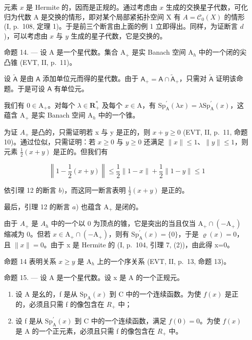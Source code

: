元素 \(x\) 是 Hermite 的，因而是正规的。通过考虑由 \(x\) 生成的交换星子代数，可化归为代数 A 是交换的情形，即对某个局部紧拓扑空间 X 有 \(A = \mathcal{C}_0(X)\) 的情形 (I, p.~108, 定理 1)。于是前三个断言由上面的例 1 立即得出。同样，为证断言 \(d\))，可以考虑由 \(x\) 与 \(y\) 生成的星子代数，它是交换的。

命题 14. --- 设 A 是一个星代数。集合 \(\mathrm{A}_{+}\) 是实 Banach 空间 \(\mathrm{A}_{h}\) 中的一个闭的尖凸锥 (EVT, II, p.~11)。

设 \(\widetilde{\mathsf{A}}\) 是由 \(\mathsf{A}\) 添加单位元而得的星代数。由于 \(\mathsf{A}_{+} = \mathsf{A} \cap \widetilde{\mathsf{A}}_{+}\)，只需对 \(\widetilde{\mathsf{A}}\) 证明该命题。于是可设 \(\mathsf{A}\) 有单位元。

我们有 \(0 \in \mathrm{A}_{+}\)。对每个 \(\lambda \in \mathbf{R}_{+}^{*}\) 及每个 \(x \in \mathrm{A}\)，有 \(\mathrm{Sp}_{\mathrm{A}}^{\prime}(\lambda x) = \lambda \mathrm{Sp}_{\mathrm{A}}^{\prime}(x)\)，这蕴含 \(\mathrm{A}_{+}\) 是实 Banach 空间 \(\mathrm{A}_{h}\) 中的一个锥。

为证 \(A_{+}\) 是凸的，只需证明若 x 与 y 是正的，则 \(x + y \geqslant 0\) (EVT, II, p.~11, 命题 10)。通过位似，只需证明：若 \(x \geqslant 0\) 与 \(y \geqslant 0\) 还满足 \(\|x\| \leqslant 1\)、\(\|y\| \leqslant 1\)，则元素 \(\frac{1}{2}(x + y)\) 是正的。但我们有

\[
\left\| 1 - \frac {1}{2} (x + y) \right\| \leqslant \frac {1}{2} \| 1 - x \| + \frac {1}{2} \| 1 - y \| \leqslant 1
\]

依引理 12 的断言 \(b)\)，而这同一断言表明 \(\frac{1}{2}(x + y)\) 是正的。

最后，引理 12 的断言 \(a\)) 也蕴含 \(\mathrm{A}_{+}\) 是闭的。

由于 \(A_{+}\) 是 \(A_{h}\) 中的一个以 0 为顶点的锥，它是突出的当且仅当 \(\mathrm{A}_{+}\cap(-\mathrm{A}_{+})\) 缩减为 0。但若 \(x\in\mathrm{A}_{+}\cap(-\mathrm{A}_{+})\)，则有 \(\mathrm{Sp}_{\mathrm{A}}^{\prime}(x)=\{0\}\)，于是 \(\varrho(x)=0\)，且 \(\|x\|=0\)。由于 x 是 Hermite 的 (I, p.~104, 引理 7, (2))，由此得 x=0。

命题 14 表明关系 \(x\geqslant y\) 是 \(\mathrm{A}_h\) 上的一个序关系 (EVT, II, p.~13, 命题 13)。

命题 15. — 设 A 是一个星代数。设 x 是 A 的一个正规元。

\begin{enumerate}
\def\labelenumi{\alph{enumi})}
\item
  设 A 是幺的，f 是从 \(\mathrm{Sp}_{\mathrm{A}}(x)\) 到 C 中的一个连续函数。为使 \(f(x)\) 是正的，必须且只需 f 的像包含在 \(R_{+}\) 中；
\item
  设 f 是从 \(\mathrm{Sp}_{\mathrm{A}}^{\prime}(x)\) 到 C 中的一个连续函数，满足 \(f(0)=0\)。为使 \(f(x)\) 是 A 的一个正元素，必须且只需 f 的像包含在 \(R_{+}\) 中。
\end{enumerate}

